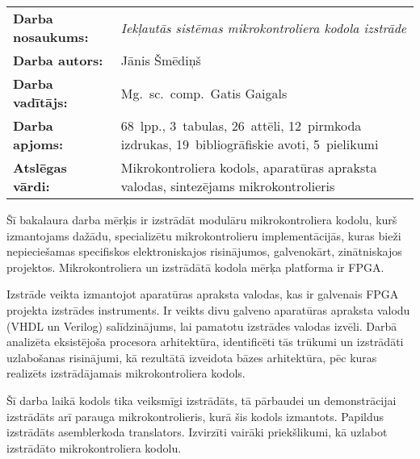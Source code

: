 
\abstitlestyle{\abstractname} %
\noindent%
\begin{tabularx}{\textwidth}{lX}
	\textbf{Darba nosaukums:} & 
		\textit{Iekļautās sistēmas mikrokontroliera kodola izstrāde}\\[1ex]
	\textbf{Darba autors:} & Jānis Šmēdiņš\\[1ex]
	\textbf{Darba vadītājs:} & Mg.~sc.~comp.~Gatis Gaigals\\[1ex]
	\textbf{Darba apjoms:} & 68~lpp., 3~tabulas, 26~attēli,
		12~pirmkoda izdrukas, 19~bibliogrāfiskie avoti, 5~pielikumi\\[1ex]
	\textbf{Atslēgas vārdi:} & Mikrokontroliera kodols, aparatūras apraksta valodas,
		sintezējams mikrokontrolieris
\end{tabularx}

\vspace{1em}
Šī bakalaura darba mērķis ir izstrādāt modulāru mikrokontroliera kodolu,
kurš izmantojams dažādu, specializētu mikrokontrolieru implementācijās,
kuras bieži nepieciešamas specifiskos elektroniskajos risinājumos,
galvenokārt, zinātniskajos projektos. Mikrokontroliera un
izstrādātā kodola mērķa platforma ir FPGA.

Izstrāde veikta izmantojot aparatūras apraksta valodas, kas ir galvenais
FPGA projekta izstrādes instruments. Ir veikts divu galveno aparatūras
apraksta valodu (VHDL un Verilog) salīdzinājums, lai pamatotu izstrādes valodas izvēli.
Darbā analizēta eksistējoša procesora
arhitektūra, identificēti tās
trūkumi un izstrādāti uzlabošanas risinājumi, kā rezultātā izveidota 
bāzes arhitektūra, pēc kuras
realizēts izstrādājamais mikrokontroliera kodols.

Šī darba laikā kodols tika veiksmīgi izstrādāts, tā pārbaudei un 
demonstrācijai izstrādāts arī parauga mikrokontrolieris, kurā šis kodols
izmantots. Papildus izstrādāts asemblerkoda translators.
Izvirzīti vairāki priekšlikumi, kā uzlabot izstrādāto
mikrokontroliera kodolu.

